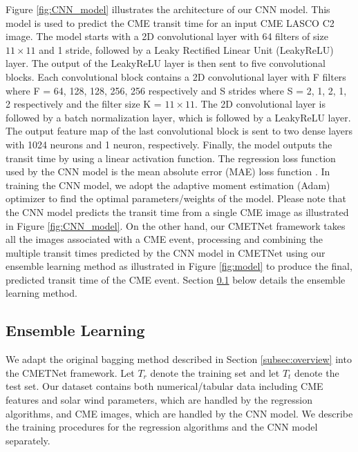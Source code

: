 \documentclass{article}
\begin{document}
Figure \ref{fig:CNN_model} illustrates the architecture of our
CNN model.
This model is used to predict the CME transit time for an input CME LASCO C2 image. 
The model starts with a 2D convolutional layer with 64 filters of size $11 \times 11$ and 1 stride,
followed by a Leaky Rectified Linear Unit (LeakyReLU) layer. 
The output of the LeakyReLU layer is then sent to
five convolutional blocks.
Each convolutional block contains 
a 2D convolutional layer with 
F filters where F = 64, 128, 128, 256, 256 respectively and
S strides where S = 2, 1, 2, 1, 2 respectively
and the filter size K = $11 \times 11$.
The 2D convolutional layer is followed by a batch normalization layer, 
which is followed by a LeakyReLU layer. 
The output feature map of the last convolutional block 
is sent to two dense layers with 1024 neurons and 1 neuron, respectively. 
Finally, the model outputs the transit time by using a linear activation function. 
The regression loss function used by the CNN model is the mean absolute error (MAE) loss function \citep{DBLP:journals/siamrev/Berk92}. 
In training the CNN model, 
we adopt the adaptive moment estimation (Adam) optimizer \citep{Goodfellow-et-al-2016}
to find the optimal parameters/weights of the model.
Please note that the CNN model predicts the transit time from a single CME image
as illustrated in Figure \ref{fig:CNN_model}. 
On the other hand, our CMETNet framework takes all the images associated with a CME event, 
processing and combining the multiple transit times predicted by the CNN model in CMETNet 
using our ensemble learning method as illustrated in Figure \ref{fig:model} to produce the final, predicted transit time of the CME event.
Section \ref{sec:ensemble_learning} below details the 
ensemble learning method.

\subsection{Ensemble Learning}
\label{sec:ensemble_learning}

We adapt the original bagging method described 
in Section \ref{subsec:overview} into the CMETNet framework.
Let $T_{r}$ denote the training set and let $T_{t}$ denote the test set.
Our dataset contains both numerical/tabular data
including CME features and solar wind parameters, which are handled by
the regression algorithms, and CME images, which are handled by the CNN model.
We describe the training procedures for the regression algorithms and
the CNN model separately.
\end{document}
